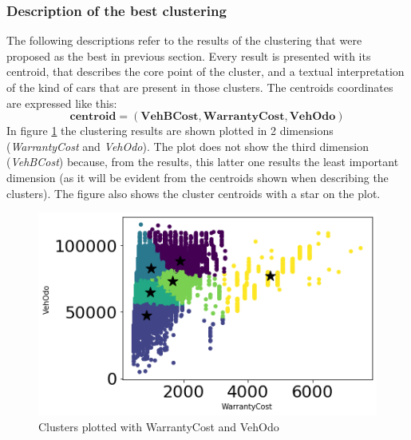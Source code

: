 \documentclass{article}
\begin{document}
	
	\subsubsection{Description of the best clustering}
	\label{sec:clusterdescr}
	The following descriptions refer to the results of the clustering that were proposed as the best in previous section. Every result is presented with its centroid, that describes the core point of the cluster, and a textual interpretation of the kind of cars that are present in those clusters. 
	The centroids coordinates are expressed like this:  
	$$ \mathbf{centroid} = (\mathbf{VehBCost}, \mathbf{WarrantyCost}, \mathbf{VehOdo}) $$
	In figure \ref{fig:centroid} the clustering results are shown plotted in 2 dimensions (\emph{WarrantyCost} and \emph{VehOdo}). The plot does not show the third dimension (\emph{VehBCost}) because, from the results, this latter one results the least important dimension (as it will be evident from the centroids shown when describing the clusters).
	The figure also shows the cluster centroids with a star on the plot. 
	
	\begin{figure}[H]
		\centering
		\includegraphics[width=.7\textwidth, keepaspectratio]{centroid}
		\caption{{Clusters plotted with WarrantyCost and VehOdo}}
		\label{fig:centroid}
	\end{figure}
	
\end{document}
